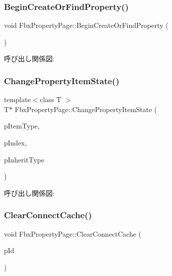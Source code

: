\subsubsection{\texorpdfstring{Begin\+Create\+Or\+Find\+Property()}{BeginCreateOrFindProperty()}}
{\footnotesize\ttfamily void Fbx\+Property\+Page\+::\+Begin\+Create\+Or\+Find\+Property (\begin{DoxyParamCaption}{ }\end{DoxyParamCaption})}

呼び出し関係図\+:
\mbox{\label{class_fbx_property_page_af61ed9031e020731756e072e5632ce29}} 
\subsubsection{\texorpdfstring{Change\+Property\+Item\+State()}{ChangePropertyItemState()}}
{\footnotesize\ttfamily template$<$class T $>$ \\
T$\ast$ Fbx\+Property\+Page\+::\+Change\+Property\+Item\+State (\begin{DoxyParamCaption}\item[{const T $\ast$}]{p\+Item\+Type,  }\item[{\hyperlink{fbxtypes_8h_a088fa96de3b0b3ea69f0f6afef525dfb}{Fbx\+Int}}]{p\+Index,  }\item[{\hyperlink{class_fbx_property_flags_ae3b667a4fcac4b827fa186a698fec2f8}{Fbx\+Property\+Flags\+::\+E\+Inherit\+Type}}]{p\+Inherit\+Type }\end{DoxyParamCaption})}

呼び出し関係図\+:
\mbox{\label{class_fbx_property_page_a782f081a93c92aa0005d5b96c4ee04e8}} 
\subsubsection{\texorpdfstring{Clear\+Connect\+Cache()}{ClearConnectCache()}}
{\footnotesize\ttfamily void Fbx\+Property\+Page\+::\+Clear\+Connect\+Cache (\begin{DoxyParamCaption}\item[{\hyperlink{fbxtypes_8h_a088fa96de3b0b3ea69f0f6afef525dfb}{Fbx\+Int}}]{p\+Id }\end{DoxyParamCaption})}

